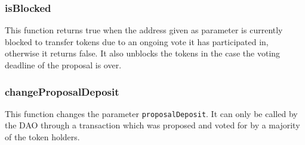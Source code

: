 \documentclass[9pt,oneside]{amsart}
\begin{document}
\begin{multicols}{2}
\subsubsection*{isBlocked}
This function returns true when the address given as parameter is currently blocked to transfer tokens due to an ongoing vote it has participated in, otherwise it returns false. It also unblocks the tokens in the case the voting deadline of the proposal is over.

\subsubsection*{changeProposalDeposit}
This function changes the parameter \verb|proposalDeposit|. It can only be called by the DAO through a transaction which was proposed and voted for by a majority of the token holders.


\end{multicols}
\end{document}
